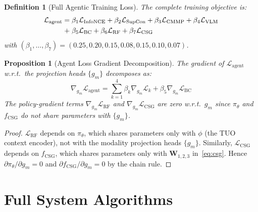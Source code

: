 \documentclass[10pt,conference]{IEEEtran}
\theoremstyle{ieeethm}
\newtheorem{proposition}[theorem]{Proposition}
\theoremstyle{ieeedef}
\newtheorem{definition}[theorem]{Definition}
\theoremstyle{ieeeremark}
\begin{document}
\begin{definition}[Full Agentic Training Loss]
\label{def:agent_loss}
The complete training objective is:
\begin{align}
\mathcal{L}_\text{agent} = \;&\beta_1 \mathcal{L}_\text{InfoNCE} + \beta_2 \mathcal{L}_\text{SupCon} + \beta_3 \mathcal{L}_\text{CMMP} + \beta_4 \mathcal{L}_\text{VLM}\notag\\
                          + \;&\beta_5 \mathcal{L}_\text{BC} + \beta_6 \mathcal{L}_\text{RF} + \beta_7 \mathcal{L}_\text{CSG}
\label{eq:agent_loss}
\end{align}
with $(\beta_1, \ldots, \beta_7) = (0.25, 0.20, 0.15, 0.08, 0.15, 0.10, 0.07)$.
\end{definition}

\begin{proposition}[Agent Loss Gradient Decomposition]
\label{prop:grad_decomp}
The gradient of $\mathcal{L}_\text{agent}$ w.r.t.\ the projection heads $\{g_m\}$ decomposes as:
\begin{equation}
\nabla_{g_m} \mathcal{L}_\text{agent} = \sum_{k=1}^{4} \beta_k \nabla_{g_m} \mathcal{L}_k + \beta_5 \nabla_{g_m} \mathcal{L}_\text{BC}
\label{eq:grad_decomp}
\end{equation}
The policy-gradient terms $\nabla_{g_m} \mathcal{L}_\text{RF}$ and $\nabla_{g_m} \mathcal{L}_\text{CSG}$ are zero w.r.t.\ $g_m$ since $\pi_\theta$ and $f_\text{CSG}$ do not share parameters with $\{g_m\}$.
\end{proposition}
\begin{proof}
$\mathcal{L}_\text{RF}$ depends on $\pi_\theta$, which shares parameters only with $\phi$ (the TUO context encoder), not with the modality projection heads $\{g_m\}$. Similarly, $\mathcal{L}_\text{CSG}$ depends on $f_\text{CSG}$, which shares parameters only with $\mathbf{W}_{1,2,3}$ in~\eqref{eq:csg}. Hence $\partial \pi_\theta / \partial g_m = 0$ and $\partial f_\text{CSG} / \partial g_m = 0$ by the chain rule.
\end{proof}

\section{Full System Algorithms}
\label{sec:algorithms}
\end{document}

